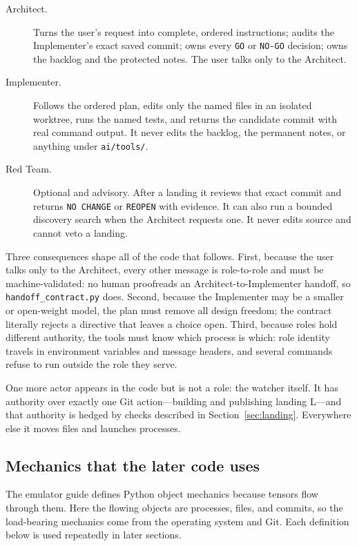 \documentclass[10pt,aps,prd,twocolumn,nofootinbib]{revtex4-2}
\newcommand{\code}[1]{\texttt{#1}}
\newcommand{\file}[1]{\texttt{#1}}
\begin{document}
\begin{description}
  \item[Architect.]  Turns the user's request into complete, ordered
  instructions; audits the Implementer's exact saved commit; owns every
  \code{GO} or \code{NO-GO} decision; owns the backlog and the
  protected notes.  The user talks only to the Architect.

  \item[Implementer.]  Follows the ordered plan, edits only the named
  files in an isolated worktree, runs the named tests, and returns the
  candidate commit with real command output.  It never edits the
  backlog, the permanent notes, or anything under \file{ai/tools/}.

  \item[Red Team.]  Optional and advisory.  After a landing it reviews
  that exact commit and returns \code{NO CHANGE} or \code{REOPEN} with
  evidence.  It can also run a bounded discovery search when the
  Architect requests one.  It never edits source and cannot veto a
  landing.
\end{description}

Three consequences shape all of the code that follows.  First, because
the user talks only to the Architect, every other message is
role-to-role and must be machine-validated: no human proofreads an
Architect-to-Implementer handoff, so \file{handoff\_contract.py} does.
Second, because the Implementer may be a smaller or open-weight model,
the plan must remove all design freedom; the contract literally rejects
a directive that leaves a choice open.  Third, because roles hold
different authority, the tools must know which process is which:
role identity travels in environment variables and message headers, and
several commands refuse to run outside the role they serve.

One more actor appears in the code but is not a role: the watcher
itself.  It has authority over exactly one Git action---building and
publishing landing L---and that authority is hedged by checks described
in Section~\ref{sec:landing}.  Everywhere else it moves files and
launches processes.

\subsection{Mechanics that the later code uses}
\label{sec:mechanics}

The emulator guide defines Python object mechanics because tensors flow
through them.  Here the flowing objects are processes, files, and
commits, so the load-bearing mechanics come from the operating system
and Git.  Each definition below is used repeatedly in later sections.
\end{document}
